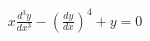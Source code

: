 \documentclass[preview]{standalone}
\begin{document}
\begin{align*}
x\frac{d^3y}{dx^3}-\left(\frac{dy}{dx}\right)^4+y=0
\end{align*}
\end{document}
